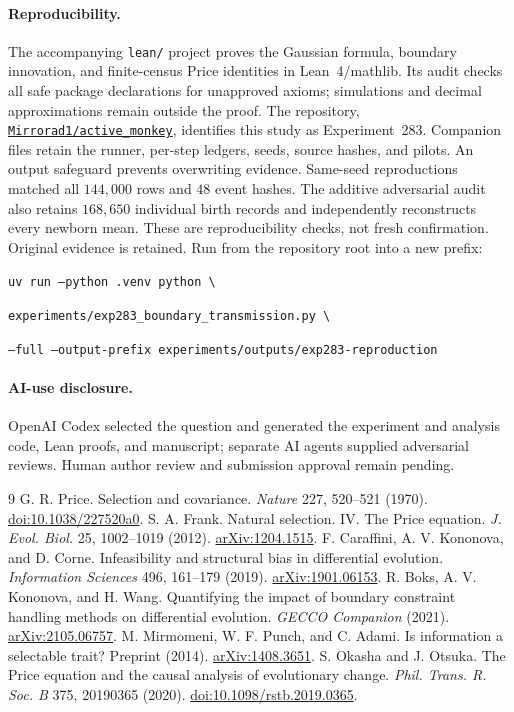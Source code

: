 \documentclass[10pt]{article}
\begin{document}
\paragraph{Reproducibility.}
The accompanying \texttt{lean/} project proves the Gaussian formula, boundary innovation, and finite-census Price identities in Lean~4/mathlib. Its audit checks all safe package declarations for unapproved axioms; simulations and decimal approximations remain outside the proof.
The repository, \href{https://github.com/Mirrorad1/active_monkey}{\texttt{Mirrorad1/active\_monkey}}, identifies this study as Experiment~283. Companion files retain the runner, per-step ledgers, seeds, source hashes, and pilots. An output safeguard prevents overwriting evidence. Same-seed reproductions matched all $144{,}000$ rows and $48$ event hashes. The additive adversarial audit also retains $168{,}650$ individual birth records and independently reconstructs every newborn mean. These are reproducibility checks, not fresh confirmation. Original evidence is retained. Run from the repository root into a new prefix:\par
\noindent\small\texttt{uv run --python .venv python \textbackslash}\par
\noindent\small\texttt{experiments/exp283\_boundary\_transmission.py \textbackslash}\par
\noindent\small\texttt{--full --output-prefix experiments/outputs/exp283-reproduction}\par
\normalsize

\paragraph{AI-use disclosure.}
OpenAI Codex selected the question and generated the experiment and analysis code, Lean proofs, and manuscript; separate AI agents supplied adversarial reviews. Human author review and submission approval remain pending.

\begingroup\small
\begin{thebibliography}{9}
\setlength{\itemsep}{0pt}
 G. R. Price. Selection and covariance. \emph{Nature} 227, 520--521 (1970). \href{https://doi.org/10.1038/227520a0}{doi:10.1038/227520a0}.
 S. A. Frank. Natural selection. IV. The Price equation. \emph{J. Evol. Biol.} 25, 1002--1019 (2012). \href{https://arxiv.org/abs/1204.1515}{arXiv:1204.1515}.
 F. Caraffini, A. V. Kononova, and D. Corne. Infeasibility and structural bias in differential evolution. \emph{Information Sciences} 496, 161--179 (2019). \href{https://arxiv.org/abs/1901.06153}{arXiv:1901.06153}.
 R. Boks, A. V. Kononova, and H. Wang. Quantifying the impact of boundary constraint handling methods on differential evolution. \emph{GECCO Companion} (2021). \href{https://arxiv.org/abs/2105.06757}{arXiv:2105.06757}.
 M. Mirmomeni, W. F. Punch, and C. Adami. Is information a selectable trait? Preprint (2014). \href{https://arxiv.org/abs/1408.3651}{arXiv:1408.3651}.
 S. Okasha and J. Otsuka. The Price equation and the causal analysis of evolutionary change. \emph{Phil. Trans. R. Soc. B} 375, 20190365 (2020). \href{https://doi.org/10.1098/rstb.2019.0365}{doi:10.1098/rstb.2019.0365}.
\end{thebibliography}
\endgroup
\end{document}
